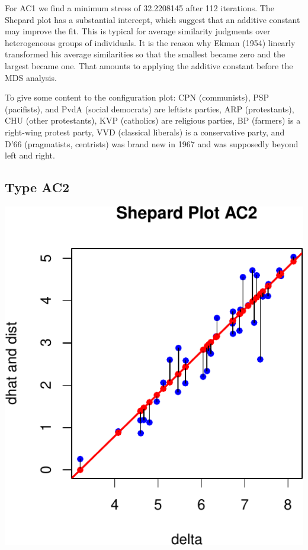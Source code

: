 \documentclass[
  12pt,
]{article}
\begin{document}
For AC1 we find a minimum stress of 32.2208145 after 112 iterations.
The Shepard plot has a substantial intercept, which suggest that an additive
constant may improve the fit. This is typical for average similarity judgments
over heterogeneous groups of individuals. It is the reason why Ekman (1954)
linearly transformed his average similarities so that the smallest became zero
and the largest became one. That amounts to applying the additive constant before
the MDS analysis.

To give some content to the configuration plot: CPN (communists), PSP (pacifists),
and PvdA (social democrats) are leftists parties, ARP (protestants), CHU (other
protestants), KVP (catholics) are religious parties, BP (farmers) is a
right-wing protest party, VVD (classical liberals) is a conservative party, and D'66
(pragmatists, centrists) was brand new in 1967 and was supposedly beyond left and right.

\subsection{Type AC2}\label{type-ac2-1}

\begin{center}\includegraphics{smacofAC_files/figure-latex/gruijterh10-1} \end{center}
\end{document}
